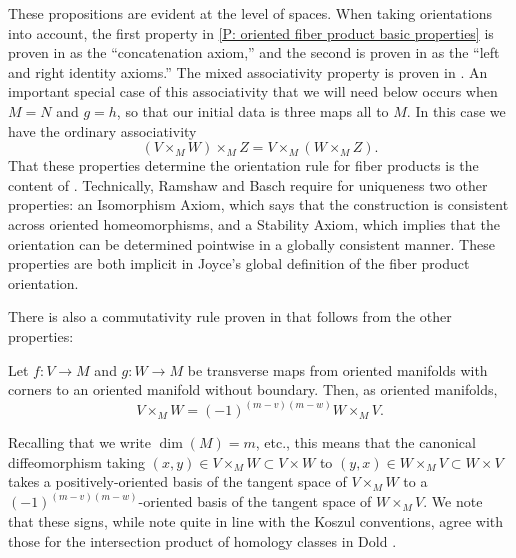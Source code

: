 These propositions are evident at the level of spaces.
When taking orientations into account, the first property in \cref{P: oriented fiber product basic properties} is proven in \cite[Sections 9.3.9]{RamBas09} as the ``concatenation axiom,'' and the second is proven in \cite[Sections 9.3.5 and 9.3.6]{RamBas09} as the ``left and right identity axioms.''
The mixed associativity property is proven in \cite[Sections 9.3.7]{RamBas09}.
An important special case of this associativity that we will need below occurs when $M = N$ and $g = h$, so that our initial data is three maps all to $M$.
In this case we have the ordinary associativity
\begin{equation}\label{E: oriented fiber associativity}
	(V \times_M W) \times_M Z = V \times_M (W \times_M Z).
\end{equation}
That these properties determine the orientation rule for fiber products is the content of \cite[Theorem 9-10]{RamBas09}.
Technically, Ramshaw and Basch require for uniqueness two other properties: an Isomorphism Axiom, which says that the construction is consistent across oriented homeomorphisms, and a Stability Axiom, which implies that the orientation can be determined pointwise in a globally consistent manner.
These properties are both implicit in Joyce's global definition of the fiber product orientation.

There is also a commutativity rule proven in \cite[Sections 9.3.8]{RamBas09} that follows from the other properties:

\begin{proposition}\label{P: commute oriented fiber}
	Let $f \colon V \to M$ and $g \colon W \to M$ be transverse maps from oriented manifolds with corners to an oriented manifold without boundary.
	Then, as oriented manifolds,
	\begin{equation*}
		V \times_M W = (-1)^{(m-v)(m-w)}W \times_M V.
	\end{equation*}
\end{proposition}

Recalling that we write $\dim(M)=m$, etc., this means that the canonical diffeomorphism taking $(x,y) \in V \times_M W \subset V \times W$ to $(y,x) \in W \times_M V \subset W \times V$ takes a positively-oriented basis of the tangent space of $V \times_M W$ to a $(-1)^{(m-v)(m-w)}$-oriented basis of the tangent space of $W \times_M V$.
We note that these signs, while note quite in line with the Koszul conventions, agree with those for the intersection product of homology classes in Dold \cite[Section VIII.13]{Dol72}.

